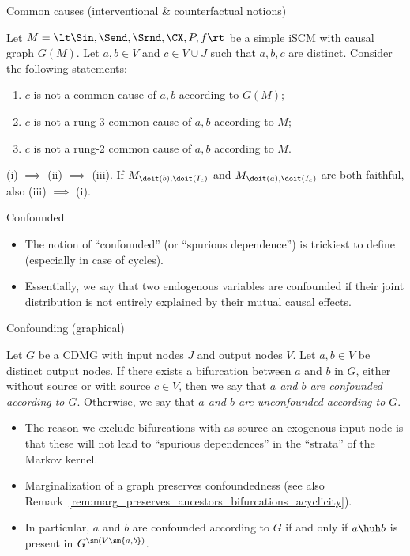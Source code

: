 \begin{frame}{Common causes (interventional \& counterfactual notions)}

\begin{Cor}[\ref{cor:scm_common_cause_of}]
  Let $M = \lt \Sin, \Send, \Srnd, \CX, P, f \rt$ be a simple iSCM with causal graph $G(M)$.
  Let $a, b \in V$ and $c \in V \cup J$ such that $a,b,c$ are distinct.
  Consider the following statements:
  \begin{enumerate}
    \item[(i)] $c$ is not a common cause of $a,b$ according to $G(M)$;
    \item[(ii)] $c$ is not a rung-3 common cause of $a,b$ according to $M$;
    \item[(iii)] $c$ is not a rung-2 common cause of $a,b$ according to $M$.
  \end{enumerate}
  (i) $\implies$ (ii) $\implies$ (iii). If $M_{\doit(b),\doit(I_c)}$ and $M_{\doit(a),\doit(I_c)}$ are both faithful, also (iii) $\implies$ (i).
\end{Cor}
\end{frame}

\begin{frame}{Confounded}
  \begin{itemize}
    \item The notion of ``confounded'' (or ``spurious dependence'') is trickiest to define (especially in case of cycles).
    \item Essentially, we say that two endogenous variables are confounded if their joint distribution is not entirely explained by their mutual causal effects.
  \end{itemize}
\end{frame}

\begin{frame}{Confounding (graphical)}
\begin{Def}[\ref{def:graph_unconfounded}]
  Let $G$ be a CDMG with input nodes $J$ and output nodes $V$.
  Let $a,b \in V$ be distinct output nodes.
  If there exists a bifurcation between $a$ and $b$ in $G$, either without source or with source $c \in V$, then we say that \emph{$a$ and $b$ are confounded according to $G$}.
  Otherwise, we say that \emph{$a$ and $b$ are unconfounded according to $G$}.
\end{Def}
  \begin{itemize}
    \item The reason we exclude bifurcations with as source an exogenous input node is that these will not lead to ``spurious dependences'' in the ``strata'' of the Markov kernel.
    \item  Marginalization of a graph preserves confoundedness (see also Remark~\ref{rem:marg_preserves_ancestors_bifurcations_acyclicity}).
    \item In particular, $a$ and $b$ are confounded according to $G$ if and only if $a \huh b$ %
  is present in $G^{\sm (V \sm \{a,b\})}$.
  \end{itemize}
\end{frame}


